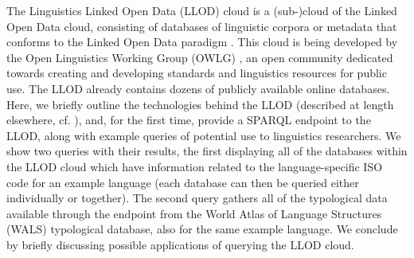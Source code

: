 The Linguistics Linked Open Data (LLOD) cloud is a (sub-)cloud of the Linked Open Data cloud, consisting of databases of linguistic corpora or metadata that conforms to the Linked Open Data paradigm \citep{bernersLee2006_linkeddata}. This cloud is being developed by the Open Linguistics Working Group (OWLG) \cite{owlg4lrec}, an open community dedicated towards creating and developing standards and linguistics resources for public use. The LLOD already contains dozens of publicly available online databases. Here, we briefly outline the technologies behind the LLOD (described at length elsewhere, cf. \cite{ldl-llod, ChiarcosLOD}), and, for the first time, provide a SPARQL endpoint to the LLOD, along with example queries of potential use to linguistics researchers. We show two queries with their results, the first displaying all of the databases within the LLOD cloud which have information related to the language-specific ISO code for an example language (each database can then be queried either individually or together). The second query gathers all of the typological data available through the endpoint from the World Atlas of Language Structures (WALS) \citep{Haspelmath_etal2008} typological database, also for the same example language. We conclude by briefly discussing possible applications of querying the LLOD cloud. 